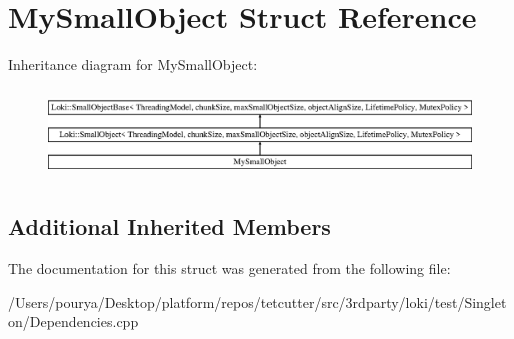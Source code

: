 \hypertarget{structMySmallObject}{}\section{My\+Small\+Object Struct Reference}
\label{structMySmallObject}
Inheritance diagram for My\+Small\+Object\+:\begin{figure}[H]
\begin{center}
\leavevmode
\includegraphics[height=2.366197cm]{structMySmallObject}
\end{center}
\end{figure}
\subsection*{Additional Inherited Members}


The documentation for this struct was generated from the following file\+:\begin{DoxyCompactItemize}
\item 
/\+Users/pourya/\+Desktop/platform/repos/tetcutter/src/3rdparty/loki/test/\+Singleton/Dependencies.\+cpp\end{DoxyCompactItemize}
